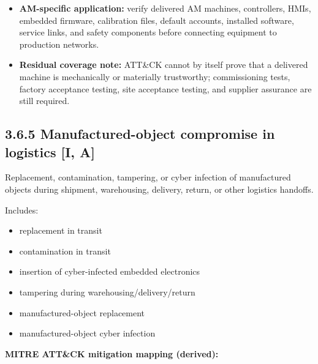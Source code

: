 \documentclass[10pt,a4paper,oneside]{report}
\begin{document}
\begin{itemize}
\item \textbf{AM-specific application:} verify delivered AM machines, controllers, HMIs, embedded firmware, calibration files, default accounts, installed software, service links, and safety components before connecting equipment to production networks.
\end{itemize}

\begin{itemize}
\item \textbf{Residual coverage note:} ATT\&CK cannot by itself prove that a delivered machine is mechanically or materially trustworthy; commissioning tests, factory acceptance testing, site acceptance testing, and supplier assurance are still required.
\end{itemize}


\subsection{3.6.5 Manufactured-object compromise in logistics [I, A]}


Replacement, contamination, tampering, or cyber infection of manufactured objects during shipment, warehousing, delivery, return, or other logistics handoffs.

Includes:

\begin{itemize}
\item replacement in transit
\item contamination in transit
\item insertion of cyber-infected embedded electronics
\item tampering during warehousing/delivery/return
\item manufactured-object replacement
\item manufactured-object cyber infection
\end{itemize}

\textbf{MITRE ATT\&CK mitigation mapping (derived):}
\end{document}

